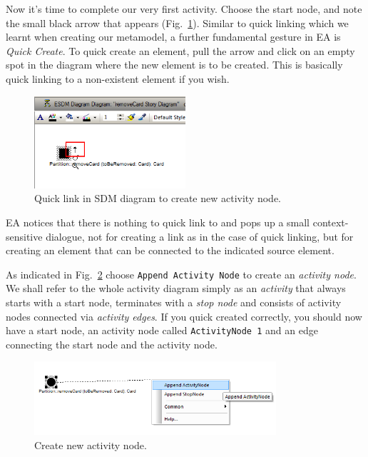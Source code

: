Now it's time to complete our very first activity. 
Choose the start node, and note the small black arrow that appears (Fig.~\ref{fig:sdm_quicklink}).  
Similar to quick linking which we learnt when creating our metamodel, a further fundamental gesture in EA is \emph{Quick
Create}. 
To quick create an element, pull the arrow and click on an empty spot in the diagram where the new element is to be created.  
This is basically quick linking to a non-existent element if you wish.

\begin{figure}[htp]
\begin{center}
  \includegraphics[width=0.5\textwidth]{pics/sdmBilder/removeCard/sdm03RAW}
  \caption{Quick link in SDM diagram to create new activity node.}  
  \label{fig:sdm_quicklink}
\end{center}
\end{figure}

EA notices that there is nothing to quick link to and pops up a small context-sensitive dialogue, not for creating a link as in the case of quick linking, but for creating an element that can be connected to the indicated source element. 

As indicated in Fig.~\ref{fig:sdm_new_activity_node} choose \texttt{Append Activity Node} to create an \emph{activity node}.  
We
shall refer to the whole activity diagram simply as an \emph{activity} that always starts with a start node, terminates with a \emph{stop node} and consists of activity nodes connected via \emph{activity edges}.  
If you quick created correctly, you should now have a start node, an activity node called \texttt{ActivityNode 1} and an edge connecting the start node and the activity node.

\begin{figure}[htp]
\begin{center}
  \includegraphics[width=0.8\textwidth]{pics/sdmBilder/removeCard/sdm04RAW}
  \caption{Create new activity node.}  
  \label{fig:sdm_new_activity_node}
\end{center}
\end{figure}

